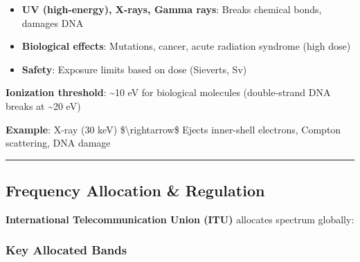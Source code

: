 \begin{itemize}
\tightlist
\item
  \textbf{UV (high-energy), X-rays, Gamma rays}: Breaks chemical bonds,
  damages DNA
\item
  \textbf{Biological effects}: Mutations, cancer, acute radiation
  syndrome (high dose)
\item
  \textbf{Safety}: Exposure limits based on dose (Sieverts, Sv)
\end{itemize}

\textbf{Ionization threshold}: \textasciitilde10 eV for biological
molecules (double-strand DNA breaks at \textasciitilde20 eV)

\textbf{Example}: X-ray (30 keV) \$\textbackslash rightarrow\$ Ejects
inner-shell electrons, Compton scattering, DNA damage

\begin{center}\rule{0.5\linewidth}{0.5pt}\end{center}

\subsection{Frequency Allocation \&
Regulation}\label{frequency-allocation-regulation}

\textbf{International Telecommunication Union (ITU)} allocates spectrum
globally:

\subsubsection{Key Allocated Bands}\label{key-allocated-bands}

